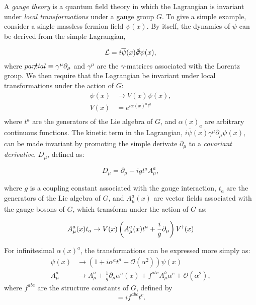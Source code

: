 A \emph{gauge theory} is a quantum field theory in which the Lagrangian is invariant under \emph{local transformations} under a gauge group $G$. To give a simple example, consider a single massless fermion field $\psi(x)$. By itself, the dynamics of $\psi$ can be derived from the simple Lagrangian,

\begin{equation}
	\mathcal{L} = i\overline{\psi}(x) \slashed{\partial} \psi(x),
\end{equation}
where $\slashed{partial}\equiv \gamma^{\mu}\partial_{\mu}$ and $\gamma^{\mu}$ are the $\gamma$-matrices associated with the Lorentz group. We then require that the Lagrangian be invariant under local transformations under the action of $G$:
 \begin{align*}
 	\psi(x) &\rightarrow V(x) \psi(x), \\
 	V(x) &= e^{i\alpha(x)^a t^a} \\
 \end{align*}
 where $t^a$ are the generators of the Lie algebra of $G$, and $\alpha(x)_a$ are arbitrary continuous functions. The kinetic term in the Lagrangian, $i\overline{\psi}(x)\gamma^{\mu}\partial_{\mu}\psi(x)$, can be made invariant by promoting the simple derivate $\partial_{\mu}$ to a \emph{covariant derivative}, $D_{\mu}$, defined as:

\begin{equation}\label{eqn:covariant-derivative-qcd}
	D_{\mu} = \partial_{\mu} - i g t^a A^a_{\mu},
\end{equation}

where $g$ is a coupling constant associated with the gauge interaction, $t_a$ are the generators of the Lie algebra of $G$, and $A^a_{\mu}(x)$ are vector fields associated with the gauge bosons of $G$, which transform under the action of $G$ as:

\begin{equation}
	A^a_{\mu}(x)t_a \rightarrow V(x) \left(A^a_{\mu}(x)t^a + \frac{i}{g} \partial_{\mu}\right) V^{\dagger}(x) \\
\end{equation}

For infinitesimal $\alpha(x)^a$, the transformations can be expressed more simply as:
\begin{align}
	\psi(x)&\rightarrow (1 + i\alpha^a t^a + \mathcal{O}(\alpha^2))\psi(x) \\
	A^a_{\mu} &\rightarrow A_{\mu}^a + \frac{1}{g}\partial_{\mu}\alpha^a(x) + f^{abc}A^b_{\mu}\alpha^c + \mathcal{O}(\alpha^2),
\end{align}
where $f^{abc}$ are the structure constants of $G$, defined by
\begin{equation}
	[t^a,\ t^b] = if^{abc}t^c.
\end{equation}

